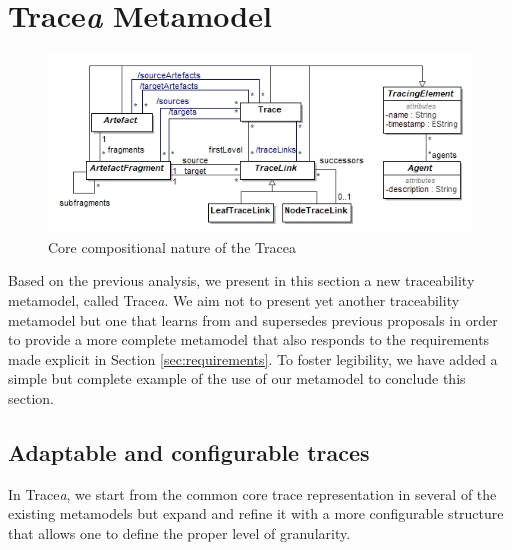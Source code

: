 \section{Trace\textit{a} Metamodel}\label{sec:metamodel}
\begin{figure}[ht] 
	\centering
	\includegraphics[width=.99\linewidth]{images/core.jpg}
	\caption{Core compositional nature of the Tracea}
	\label{fig:mm-core}
\end{figure}

Based on the previous analysis, we present in this section a new traceability metamodel, called Trace\textit{a}. We aim not to present yet another traceability metamodel but one that learns from and supersedes previous proposals in order to provide a more complete metamodel %
 that also responds  to the requirements made explicit in Section \ref{sec:requirements}. 
To foster legibility, we have added a simple but complete example of the use of our metamodel to conclude this section.

\subsection{Adaptable and configurable traces} 
 
In Trace\textit{a}, we start from the common core trace representation in several of the existing metamodels but expand and refine it with a more configurable structure that allows one to define the proper level of granularity. 

